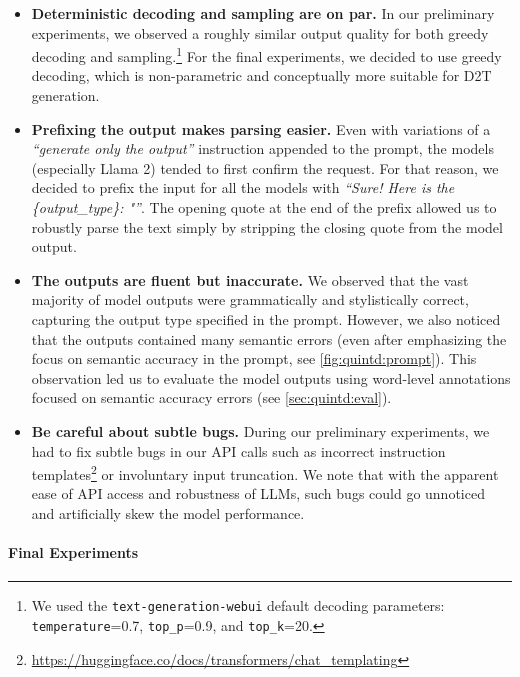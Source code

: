 \begin{itemize}
    \item\textbf{Deterministic decoding and sampling are on par.} In our preliminary experiments, we observed a roughly similar output quality for both greedy decoding and sampling.\footnote{We used the \texttt{text-generation-webui} default decoding parameters: \texttt{temperature}=0.7, \texttt{top\_p}=0.9, and \texttt{top\_k}=20.} For the final experiments, we decided to use greedy decoding, which is non-parametric and conceptually more suitable for D2T generation.

    \item\textbf{Prefixing the output makes parsing easier.} Even with variations of a \textit{``generate only the output''} instruction appended to the prompt, the models (especially Llama 2) tended to first confirm the request. For that reason, we decided to prefix the input for all the models with \textit{``Sure! Here is the \{output\_type\}: "''}. The opening quote at the end of the prefix allowed us to robustly parse the text simply by stripping the closing quote from the model output.

    \item\textbf{The outputs are fluent but inaccurate.} We observed that the vast majority of model outputs were grammatically and stylistically correct, capturing the output type specified in the prompt. However, we also noticed that the outputs contained many semantic errors (even after emphasizing the focus on semantic accuracy in the prompt, see \autoref{fig:quintd:prompt}). This observation led us to evaluate the model outputs using word-level annotations focused on semantic accuracy errors (see \autoref{sec:quintd:eval}).


    \item\textbf{Be careful about subtle bugs.} During our preliminary experiments, we had to fix subtle bugs in our API calls such as incorrect instruction templates\footnote{\url{https://huggingface.co/docs/transformers/chat_templating}} or involuntary input truncation. We note that with the apparent ease of API access and robustness of LLMs, such bugs could go unnoticed and artificially skew the model performance.

\end{itemize}



\paragraph{Final Experiments}
\label{sec:quintd:basic}

